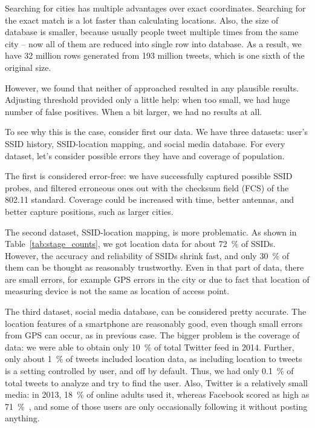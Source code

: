 \documentclass[12pt,a4paper,oneside,pdftex]{report}
\begin{document}
Searching for cities has multiple advantages over exact coordinates. Searching for the exact match is a lot faster than calculating locations. Also, the size of database is smaller, because usually people tweet multiple times from the same city -- now all of them are reduced into single row into database. As a result, we have 32 million rows generated from 193 million tweets, which is one sixth of the original size.

However, we found that neither of approached resulted in any plausible results. Adjusting threshold provided only a little help: when too small, we had huge number of false positives. When a bit larger, we had no results at all.

To see why this is the case, consider first our data. We have three datasets: user's SSID history, SSID-location mapping, and social media database. For every dataset, let's consider possible errors they have and coverage of population.

The first is considered error-free: we have successfully captured possible SSID probes, and filtered erroneous ones out with the checksum field (FCS) of the 802.11 standard. Coverage could be increased with time, better antennas, and better capture positions, such as larger cities.

The second dataset, SSID-location mapping, is more problematic. As shown in Table~\ref{tab:stage_counts}, we got location data for about 72~\% of SSIDs. However, the accuracy and reliability of SSIDs shrink fast, and only 30~\% of them can be thought as reasonably trustworthy. Even in that part of data, there are small errors, for example GPS errors in the city or due to fact that location of measuring device is not the same as location of access point.

The third dataset, social media database, can be considered pretty accurate. The location features of a smartphone are reasonably good, even though small errors from GPS can occur, as in previous case. The bigger problem is the coverage of data: we were able to obtain only 10~\% of total Twitter feed in 2014. Further, only about 1~\% of tweets included location data, as including location to tweets is a setting controlled by user, and off by default. Thus, we had only 0.1~\% of total tweets to analyze and try to find the user. Also, Twitter is a relatively small media: in 2013, 18~\% of online adults used it, whereas Facebook scored as high as 71~\%~\cite{pew_socialmedia}, and some of those users are only occasionally following it without posting anything.
\end{document}
